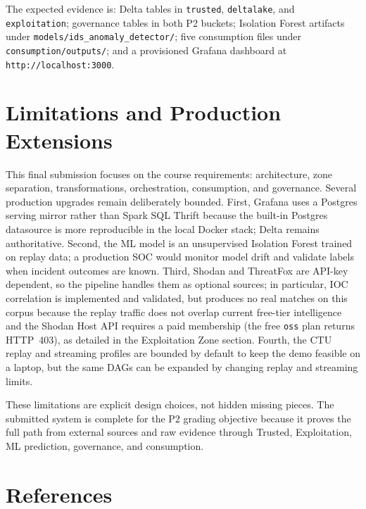 \documentclass[11pt,a4paper]{article}
\newcommand{\code}[1]{\nolinkurl{#1}}
\begin{document}
The expected evidence is: Delta tables in \code{trusted}, \code{deltalake}, and \code{exploitation}; governance tables in both P2 buckets; Isolation Forest artifacts under \code{models/ids_anomaly_detector/}; five consumption files under \code{consumption/outputs/}; and a provisioned Grafana dashboard at \code{http://localhost:3000}.

\section{Limitations and Production Extensions}

This final submission focuses on the course requirements: architecture, zone separation, transformations, orchestration, consumption, and governance. Several production upgrades remain deliberately bounded. First, Grafana uses a Postgres serving mirror rather than Spark SQL Thrift because the built-in Postgres datasource is more reproducible in the local Docker stack; Delta remains authoritative. Second, the ML model is an unsupervised Isolation Forest trained on replay data; a production SOC would monitor model drift and validate labels when incident outcomes are known. Third, Shodan and ThreatFox are API-key dependent, so the pipeline handles them as optional sources; in particular, IOC correlation is implemented and validated, but produces no real matches on this corpus because the replay traffic does not overlap current free-tier intelligence and the Shodan Host API requires a paid membership (the free \code{oss} plan returns HTTP~403), as detailed in the Exploitation Zone section. Fourth, the CTU replay and streaming profiles are bounded by default to keep the demo feasible on a laptop, but the same DAGs can be expanded by changing replay and streaming limits.

These limitations are explicit design choices, not hidden missing pieces. The submitted system is complete for the P2 grading objective because it proves the full path from external sources and raw evidence through Trusted, Exploitation, ML prediction, governance, and consumption.

\section{References}
\end{document}
